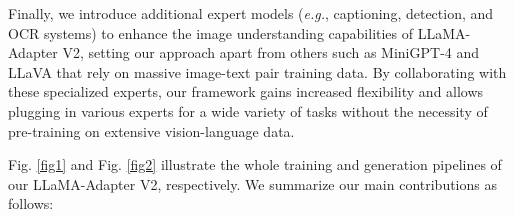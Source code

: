 \documentclass[10pt,twocolumn,letterpaper]{article}
\begin{document}
Finally, we introduce additional expert models (\emph{e.g.}, captioning, detection, and OCR systems) to enhance the image understanding capabilities of LLaMA-Adapter V2, setting our approach apart from others such as MiniGPT-4 and LLaVA that rely on massive image-text pair training data. By collaborating with these specialized experts, our framework gains increased flexibility and allows plugging in various experts for a wide variety of tasks without the necessity of pre-training on extensive vision-language data.


\begin{table*}[t]
\centering
\small
{}
\caption{\textbf{Training Comparison of Different Methods.} CC, VG and L400 represent Conceptual Caption~\cite{sharma2018conceptual,changpinyo2021conceptual}, Visual Genome~\cite{krishna2017visual} and LAION 400M~\cite{schuhmann2021laion}, respectively. Note that we count all the data and tuning parameters needed to convert the pretrained vision model and LLM into a visual instruction model. $*$ denotes the filtered dataset.}
\label{tab:param_compare_with_minigpt4_llava}
\end{table*} 
Fig. \ref{fig1} and Fig. \ref{fig2} illustrate the whole training and generation pipelines of our LLaMA-Adapter V2, respectively. We summarize our main contributions as follows:
\end{document}
